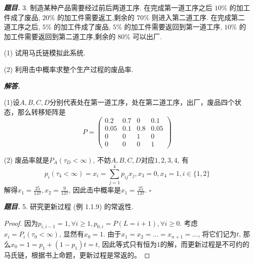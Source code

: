 \documentclass[10pt, a4paper, oneside]{ctexart}
\newenvironment{problem}{\begin{framed}\par\noindent\textbf{\textit{题目. }}}{\end{framed}\par}
\newenvironment{solution}{%
  \par\noindent\textbf{\textit{解答. }}\ignorespaces
}{%
  \hfill\ensuremath{\square}\par %
}
\begin{document}
    \begin{problem}
        3. 制造某种产品需要经过前后两道工序. 在完成第一道工序之后 \( {10}\%  \) 的加工件成了废品, \( {20}\%  \) 的加工件需要返工,剩余的 \( {70}\%  \) 则进入第二道工序. 在完成第二道工序之后, \( 5\%  \) 的加工件成了废品, \( 5\%  \) 的加工件需要返回到第一道工序, \( {10}\%  \) 的加工件需要返回到第二道工序,剩余的 \( {80}\%  \) 可以出厂.
    
    (1) 试用马氏链模拟此系统.
    
    (2) 利用击中概率求整个生产过程的废品率.
    \end{problem}
    \begin{solution}
        (1)设$A,B,C,D$分别代表处在第一道工序，处在第二道工序，出厂，废品四个状态，那么转移矩阵是
        $$P=\begin{pmatrix}
            0.2 & 0.7 & 0 &0.1 \\ 0.05 & 0.1 & 0.8 & 0.05 \\ 0 & 0 & 1 & 0 \\ 0 & 0& 0& 1
        \end{pmatrix}$$
    
        (2) 废品率就是$P_A(\tau_D<\infty)$, 不妨$A,B,C,D$对应$1,2,3,4$, 有 
        $$p_i(\tau_4<\infty)=x_i=\sum_{j=1}^4p_{ij}x_j, x_3=0,x_4=1, i\in \{1,2\}$$
        解得$x_1=\frac{25}{137}, x_2=\frac{9}{137}$, 因此击中概率是$x_1=\frac{25}{137}$.
    \end{solution}
    
    \begin{problem}
        5. 研究更新过程 (例 1.1.9) 的常返性.
    \end{problem}
    \begin{proof}
        因为$p_{i,i-1}=1, \forall i\geq 1, p_{0,i}=P(L=i+1), \forall i\geq 0$. 考虑$x_i=P_i(\tau_0<\infty)$, 显然有$x_0=1$. 由于$x_1=x_2=\dots=x_{n+1}=\dots$, 将它们记为$t$, 那么$x_0=1=p_1+(1-p_1)t=t$, 因此等式只有恒为$1$的解，而更新过程是不可约的马氏链，根据书上命题，更新过程是常返的。
    \end{proof}
\end{document}
